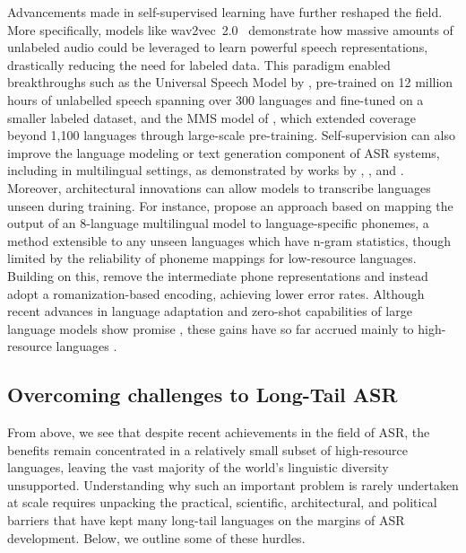 \documentclass[]{fairmeta}
\begin{document}
Advancements made in self-supervised learning have further reshaped the field. More specifically, models like wav2vec~2.0~\citep{baevski2020wav2vec} demonstrate how massive amounts of unlabeled audio could be leveraged to learn powerful speech representations, drastically reducing the need for labeled data. This paradigm enabled breakthroughs such as the Universal Speech Model by \citet{zhang2023google}, pre-trained on 12 million hours of unlabelled speech spanning over 300 languages and fine-tuned on a smaller labeled dataset, and the MMS model of \citet{pratap2024scaling}, which extended coverage beyond 1,100 languages through large-scale pre-training. Self-supervision can also improve the language modeling or text generation component of ASR systems, including in multilingual settings, as demonstrated by works by \citet{babu2021xls}, \citet{bapna2022mslam}, and \citet{pratap2024scaling}. Moreover, architectural innovations can allow models to transcribe languages unseen during training. For instance, \citet{li2022asr2k} propose an approach based on mapping the output of an 8-language multilingual model to language-specific phonemes, a method extensible to any unseen languages which have n-gram statistics, though limited by the reliability of phoneme mappings for low-resource languages. Building on this, \citet{zhao2025scaling} remove the intermediate phone representations and instead adopt a romanization-based encoding, achieving lower error rates.  Although recent advances in language adaptation and zero-shot capabilities of large language models show promise \citep{yong2023bloom}, these gains have so far accrued mainly to high-resource languages \citep{ahuja2023mega,bang2023multitask,asai2024buffet,ochieng2025beyond}. 


\subsection{Overcoming challenges to Long-Tail ASR}

From above, we see that despite recent achievements in the field of ASR, the benefits remain concentrated in a relatively small subset of high-resource languages, leaving the vast majority of the world’s linguistic diversity unsupported. Understanding why such an important problem is rarely undertaken at scale requires unpacking the practical, scientific, architectural, and political barriers that have kept many long-tail languages on the margins of ASR development. Below, we outline some of these hurdles.
\end{document}
